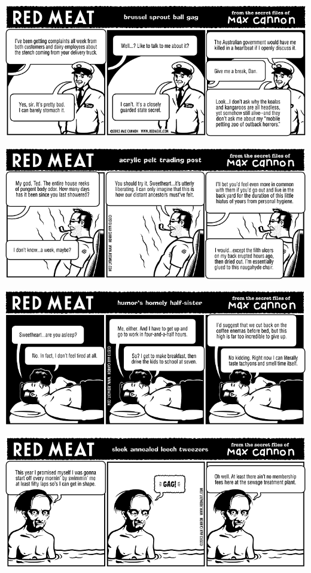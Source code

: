 \documentclass[a4paper,twoside,11pt]{article}
\begin{document}
\includegraphics[width=\textwidth]{redmeat_2013-07-23.png}



\includegraphics[width=\textwidth]{redmeat_2013-07-30.png}



\includegraphics[width=\textwidth]{redmeat_2013-08-06.png}



\includegraphics[width=\textwidth]{redmeat_2013-08-13.png}
\end{document}
